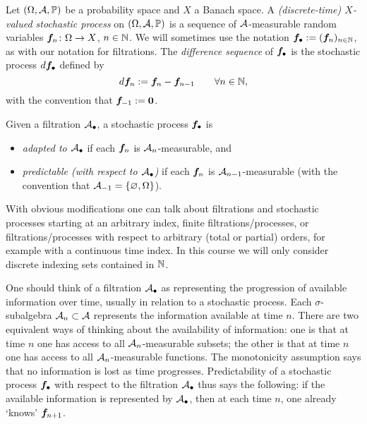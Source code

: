 \begin{defn}
  Let $(\Omega,\mathcal{A},\mathbb{P})$ be a probability space and $X$ a Banach space.
  A \emph{(discrete-time) $X$-valued stochastic process} on $(\Omega,\mathcal{A},\mathbb{P})$ is a sequence of $\mathcal{A}$-measurable random variables $\bm{f}_n \colon \Omega \rightarrow X$, $n \in \mathbb{N}$.
  We will sometimes use the notation $\bm{f}_{\bullet} := (\bm{f}_{n})_{n \in \mathbb{N}}$, as with our notation for filtrations.
  The \emph{difference sequence} of $\bm{f}_{\bullet}$ is the stochastic process $d\bm{f}_{\bullet}$ defined by
  \begin{equation*}
    d\bm{f}_n := \bm{f}_{n} - \bm{f}_{n-1} \qquad \forall n \in \mathbb{N},
  \end{equation*}
  with the convention that $\bm{f}_{-1} := \bm{0}$.
  
  Given a filtration $\mathcal{A}_{\bullet}$, a stochastic process $\bm{f}_{\bullet}$ is
  \begin{itemize}
  \item \emph{adapted to $\mathcal{A}_{\bullet}$} if each $\bm{f}_{n}$ is $\mathcal{A}_{n}$-measurable, and
  \item \emph{predictable (with respect to $\mathcal{A}_{\bullet}$)} if each $\bm{f}_n$ is $\mathcal{A}_{n-1}$-measurable (with the convention that $\mathcal{A}_{-1} = \{\varnothing, \Omega\}$).
  \end{itemize}
\end{defn}

\begin{rmk}
  With obvious modifications one can talk about filtrations and stochastic processes starting at an arbitrary index, finite filtrations/processes, or filtrations/processes with respect to arbitrary (total or partial) orders, for example with a continuous time index.
  In this course we will only consider discrete indexing sets contained in $\mathbb{N}$.
\end{rmk}

One should think of a filtration $\mathcal{A}_{\bullet}$ as representing the progression of available information over time, usually in relation to a stochastic process.
Each $\sigma$-subalgebra $\mathcal{A}_n \subset \mathcal{A}$ represents the information available at time $n$.
There are two equivalent ways of thinking about the availability of information: one is that at time $n$ one has access to all $\mathcal{A}_n$-measurable subsets; the other is that at time $n$ one has access to all $\mathcal{A}_n$-measurable functions.
The monotonicity assumption says that no information is lost as time progresses.
Predictability of a stochastic process $\bm{f}_{\bullet}$ with respect to the filtration $\mathcal{A}_{\bullet}$ thus says the following: if the available information is represented by $\mathcal{A}_{\bullet}$, then at each time $n$, one already `knows' $\bm{f}_{n+1}$.

